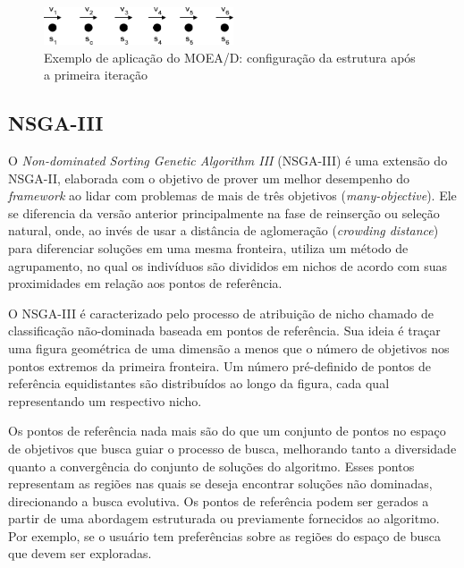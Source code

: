 \begin{figure}[!htbp]
	\centering
	\includegraphics[width=0.5\textwidth]{cap_otimizacao-multi/figs/moead-ex4}
	\caption{\label{fig_moead_ex4}Exemplo de aplicação do MOEA/D: configuração da estrutura após a primeira iteração}
\end{figure}

\FloatBarrier
\subsection{NSGA-III}

O \textit{Non-dominated Sorting Genetic Algorithm III} (NSGA-III) \cite{Deb2014} é uma extensão do NSGA-II, elaborada com o objetivo de prover um melhor desempenho do \textit{framework} ao lidar com problemas de mais de três objetivos (\textit{many-objective}). Ele se diferencia da versão anterior principalmente na fase de reinserção ou seleção natural, onde, ao invés de usar a distância de aglomeração (\textit{crowding distance}) para diferenciar soluções em uma mesma fronteira, utiliza um método de agrupamento, no qual os indivíduos são divididos em nichos de acordo com suas proximidades em relação aos pontos de referência.

O NSGA-III é caracterizado pelo processo de atribuição de nicho chamado de classificação não-dominada baseada em pontos de referência. Sua ideia é traçar uma figura geométrica de uma dimensão a menos que o número de objetivos nos pontos extremos da primeira fronteira. Um número pré-definido de pontos de referência equidistantes são distribuídos ao longo da figura, cada qual representando um respectivo nicho.

Os pontos de referência nada mais são do que um conjunto de pontos no espaço de objetivos que busca guiar o processo de busca, melhorando tanto a diversidade quanto a convergência do conjunto de soluções do algoritmo. Esses pontos representam as regiões nas quais se deseja encontrar soluções não dominadas, direcionando a busca evolutiva. Os pontos de referência podem ser gerados a partir de uma abordagem estruturada ou previamente fornecidos ao algoritmo. Por exemplo, se o usuário tem preferências sobre as regiões do espaço de busca que devem ser exploradas. 

